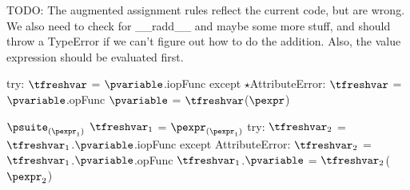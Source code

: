\documentclass{article}
\begin{document}
\begin{mathpar}
\end{mathpar}

TODO: The augmented assignment rules reflect the current code, but are wrong.
We also need to check for \_\_radd\_\_ and maybe some more stuff, and should throw a
TypeError if we can't figure out how to do the addition. Also, the value
expression should be evaluated first.
\newsavebox{\augmentedAssignmentBox}
\begin{lrbox}{\augmentedAssignmentBox}
\begin{python}
try:
  $\tfreshvar$ = $\pvariable$.iopFunc
except $\star$AttributeError:
  $\tfreshvar$ = $\pvariable$.opFunc
$\pvariable$ = $\tfreshvar$($\pexpr$)
\end{python}
\end{lrbox}

\begin{mathpar}
\end{mathpar}

\newsavebox{\augmentedAttributeAssignmentBox}
\begin{lrbox}{\augmentedAttributeAssignmentBox}
\begin{python}
$\psuite_{(\pexpr_1)}$
$\tfreshvar_1$ = $\pexpr_{(\pexpr_1)}$
try:
  $\tfreshvar_2$ = $\tfreshvar_1$.$\pvariable$.iopFunc
except AttributeError:
  $\tfreshvar_2$ = $\tfreshvar_1$.$\pvariable$.opFunc
$\tfreshvar_1$.$\pvariable$ = $\tfreshvar_2$($\pexpr_2$)
\end{python}
\end{lrbox}

\begin{mathpar}
\end{mathpar}
\end{document}

